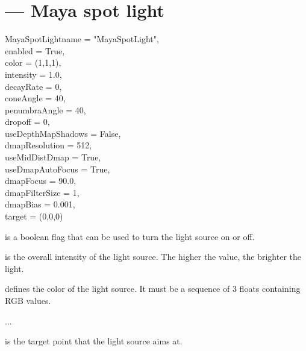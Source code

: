 
\section{ ---
         Maya spot light}

\begin{classdesc}{MayaSpotLight}{name = "MayaSpotLight",\\ 
                       enabled = True,\\
                       color = (1,1,1),\\
                       intensity = 1.0,\\
                       decayRate = 0,\\
                       coneAngle = 40,\\
                       penumbraAngle = 40,\\
                       dropoff = 0,\\
                       useDepthMapShadows = False,\\
                       dmapResolution = 512,\\
                       useMidDistDmap = True,\\
                       useDmapAutoFocus = True,\\
                       dmapFocus = 90.0,\\
                       dmapFilterSize = 1,\\
                       dmapBias = 0.001,\\
	               target = (0,0,0)
                  }

 is a boolean flag that can be used to turn the light source
on or off.

 is the overall intensity of the light source. The higher
the value, the brighter the light.

 defines the color of the light source. It must be a sequence
of 3 floats containing RGB values.

...

 is the target point that the light source aims at.

\end{classdesc}

